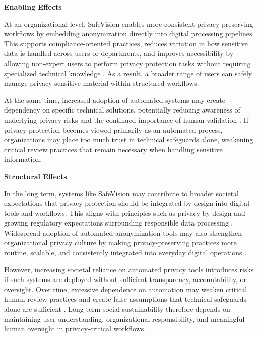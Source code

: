 \noindent\textbf{Enabling Effects}

At an organizational level, SafeVision enables more consistent privacy-preserving workflows by embedding anonymization directly into digital processing pipelines. This supports compliance-oriented practices, reduces variation in how sensitive data is handled across users or departments, and improves accessibility by allowing non-expert users to perform privacy protection tasks without requiring specialized technical knowledge \cite{voigt2017gdpr,becker2015requirements}. As a result, a broader range of users can safely manage privacy-sensitive material within structured workflows.

At the same time, increased adoption of automated systems may create dependency on specific technical solutions, potentially reducing awareness of underlying privacy risks and the continued importance of human validation \cite{amershi2019guidelines}. If privacy protection becomes viewed primarily as an automated process, organizations may place too much trust in technical safeguards alone, weakening critical review practices that remain necessary when handling sensitive information.

\noindent\textbf{Structural Effects}

In the long term, systems like SafeVision may contribute to broader societal expectations that privacy protection should be integrated by design into digital tools and workflows. This aligns with principles such as privacy by design and growing regulatory expectations surrounding responsible data processing \cite{gdpr2016,voigt2017gdpr}. Widespread adoption of automated anonymization tools may also strengthen organizational privacy culture by making privacy-preserving practices more routine, scalable, and consistently integrated into everyday digital operations \cite{becker2015requirements}.

However, increasing societal reliance on automated privacy tools introduces risks if such systems are deployed without sufficient transparency, accountability, or oversight. Over time, excessive dependence on automation may weaken critical human review practices and create false assumptions that technical safeguards alone are sufficient \cite{parasuraman1997humans,amershi2019guidelines}. Long-term social sustainability therefore depends on maintaining user understanding, organizational responsibility, and meaningful human oversight in privacy-critical workflows.


